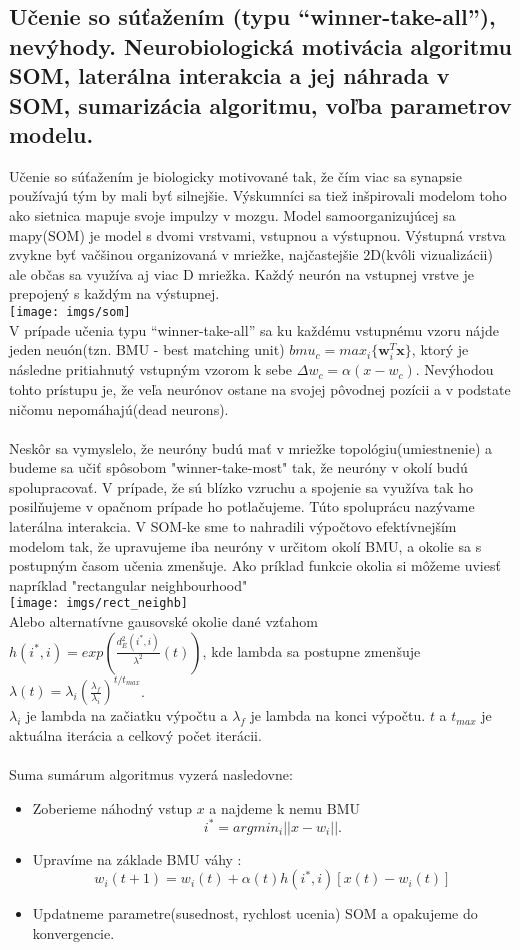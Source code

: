 \documentclass{article}
\numberwithin{equation}{section} %
\begin{document}
\subsection{Učenie so súťažením (typu “winner-take-all”), nevýhody. Neurobiologická motivácia algoritmu SOM, laterálna interakcia a jej náhrada v SOM, sumarizácia algoritmu, voľba parametrov modelu.}
Učenie so súťažením je biologicky motivované tak, že čím viac sa synapsie používajú tým by mali byť silnejšie. Výskumníci sa tiež inšpirovali modelom toho ako sietnica mapuje svoje impulzy v mozgu. Model samoorganizujúcej sa mapy(SOM) je model s dvomi vrstvami, vstupnou a výstupnou. Výstupná vrstva zvykne byť vačšinou organizovaná v mriežke, najčastejšie 2D(kvôli vizualizácii) ale občas sa využíva aj viac D mriežka. Každý neurón na vstupnej vrstve je prepojený s každým na výstupnej. \\
\texttt{[image: imgs/som]}\\
V prípade učenia typu “winner-take-all” sa ku každému vstupnému vzoru nájde jeden neuón(tzn. BMU - best matching unit) $bmu_c = max_i\{\textbf{w}_i^T\textbf{x}\}$, ktorý je následne pritiahnutý vstupným vzorom k sebe $\Delta w_c = \alpha (x - w_c)$. Nevýhodou tohto prístupu je, že veľa neurónov ostane na svojej pôvodnej pozícii a v podstate ničomu nepomáhajú(dead neurons).\\\\
Neskôr sa vymyslelo, že neuróny budú mať v mriežke topológiu(umiestnenie) a budeme sa učiť spôsobom "winner-take-most" tak, že neuróny v okolí budú spolupracovať. V prípade, že sú blízko vzruchu a spojenie sa využíva tak ho posilňujeme v opačnom prípade ho potlačujeme. Túto spoluprácu nazývame laterálna interakcia. V SOM-ke sme to nahradili výpočtovo efektívnejším modelom tak, že upravujeme iba neuróny v určitom okolí BMU, a okolie sa s postupným časom učenia zmenšuje. Ako príklad funkcie okolia si môžeme uviesť napríklad "rectangular neighbourhood"\\
\texttt{[image: imgs/rect\_neighb]}\\
Alebo alternatívne gausovské okolie dané vzťahom $h(i^*, i) = exp(\frac{d^2_E(i^*, i)}{\lambda^2}(t))$, kde lambda sa postupne zmenšuje $\lambda(t) = \lambda_i(\frac{\lambda_f}{\lambda_i})^{t/t_{max}}$. \\
$\lambda_i$ je lambda na začiatku výpočtu a $\lambda_f$ je lambda na konci výpočtu. $t$ a $t_{max}$ je aktuálna iterácia a celkový počet iterácii.
\\\\
Suma sumárum algoritmus vyzerá nasledovne:
\begin{itemize}
\item Zoberieme náhodný vstup $x$ a najdeme k nemu BMU $$i^* = arg min_i ||x - w_i||.$$
\item Upravíme na základe BMU váhy : $$ w_i(t+1) = w_i(t) + \alpha(t)h(i^*,i)[x(t) - w_i(t)] $$
\item Updatneme parametre(susednost, rychlost ucenia) SOM a opakujeme do konvergencie.
\end{itemize}
\end{document}
